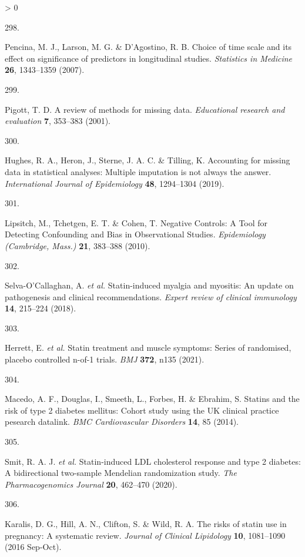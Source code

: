 \documentclass[a4paper, twoside]{templates/ociamthesis}
\newlength{\cslhangindent}
\newlength{\csllabelwidth}
\newenvironment{CSLReferences}[3] %
 {%
  \setlength{\parindent}{0pt}
  \ifodd #1 \everypar{\setlength{\hangindent}{\cslhangindent}}\ignorespaces\fi
  \ifnum #2 > 0
  \setlength{\parskip}{#2\baselineskip}
  \fi
 }%
 {}
\newcommand{\CSLLeftMargin}[1]{\parbox[t]{\maxof{\widthof{#1}}{\csllabelwidth}}{#1}}
\newcommand{\CSLRightInline}[1]{\parbox[t]{\linewidth - \csllabelwidth}{#1}}
\begin{document}
\begin{CSLReferences}{0}{0}
\leavevmode\hypertarget{ref-pencina2007}{}%
\CSLLeftMargin{298. }
\CSLRightInline{Pencina, M. J., Larson, M. G. \& D'Agostino, R. B. Choice of time scale and its effect on significance of predictors in longitudinal studies. \emph{Statistics in Medicine} \textbf{26}, 1343--1359 (2007).}

\leavevmode\hypertarget{ref-pigott2001}{}%
\CSLLeftMargin{299. }
\CSLRightInline{Pigott, T. D. A review of methods for missing data. \emph{Educational research and evaluation} \textbf{7}, 353--383 (2001).}

\leavevmode\hypertarget{ref-hughes2019}{}%
\CSLLeftMargin{300. }
\CSLRightInline{Hughes, R. A., Heron, J., Sterne, J. A. C. \& Tilling, K. Accounting for missing data in statistical analyses: Multiple imputation is not always the answer. \emph{International Journal of Epidemiology} \textbf{48}, 1294--1304 (2019).}

\leavevmode\hypertarget{ref-lipsitch2010}{}%
\CSLLeftMargin{301. }
\CSLRightInline{Lipsitch, M., Tchetgen, E. T. \& Cohen, T. Negative {Controls}: A {Tool} for {Detecting Confounding} and {Bias} in {Observational Studies}. \emph{Epidemiology (Cambridge, Mass.)} \textbf{21}, 383--388 (2010).}

\leavevmode\hypertarget{ref-selva-ocallaghan2018}{}%
\CSLLeftMargin{302. }
\CSLRightInline{Selva-O'Callaghan, A. \emph{et al.} Statin-induced myalgia and myositis: An update on pathogenesis and clinical recommendations. \emph{Expert review of clinical immunology} \textbf{14}, 215--224 (2018).}

\leavevmode\hypertarget{ref-herrett2021}{}%
\CSLLeftMargin{303. }
\CSLRightInline{Herrett, E. \emph{et al.} Statin treatment and muscle symptoms: Series of randomised, placebo controlled n-of-1 trials. \emph{BMJ} \textbf{372}, n135 (2021).}

\leavevmode\hypertarget{ref-macedo2014}{}%
\CSLLeftMargin{304. }
\CSLRightInline{Macedo, A. F., Douglas, I., Smeeth, L., Forbes, H. \& Ebrahim, S. Statins and the risk of type 2 diabetes mellitus: Cohort study using the {UK} clinical practice pesearch datalink. \emph{BMC Cardiovascular Disorders} \textbf{14}, 85 (2014).}

\leavevmode\hypertarget{ref-smit2020}{}%
\CSLLeftMargin{305. }
\CSLRightInline{Smit, R. A. J. \emph{et al.} Statin-induced {LDL} cholesterol response and type 2 diabetes: A bidirectional two-sample {Mendelian} randomization study. \emph{The Pharmacogenomics Journal} \textbf{20}, 462--470 (2020).}

\leavevmode\hypertarget{ref-karalis2016}{}%
\CSLLeftMargin{306. }
\CSLRightInline{Karalis, D. G., Hill, A. N., Clifton, S. \& Wild, R. A. The risks of statin use in pregnancy: A systematic review. \emph{Journal of Clinical Lipidology} \textbf{10}, 1081--1090 (2016 Sep-Oct).}


\end{CSLReferences}
\end{document}
